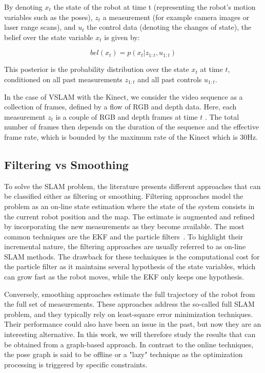 By denoting $x_t$ the state of the robot at time t (representing the robot's motion variables such as the poses), $z_t$ a measurement (for example camera images or laser range scans), and $u_t$ the control data (denoting the changes of state), the belief over the state variable $x_t$ is given by:

\[bel(x_t) = p(x_t | z_{1:t}, u_{1:t})\]

This posterior is the probability distribution over the state $x_t$ at time $t$, conditioned on all past measurements $z_{1:t}$ and all past controls $u_{1:t}$.

In the case of \gls{VSLAM} with the Kinect, we consider the video sequence as a collection of frames, defined by a flow of RGB and depth data. Here, each measurement $z_t$ is a couple of RGB and depth frames at time $t$ . The total number of frames then depends on the duration of the sequence and the effective frame rate, which is bounded by the maximum rate of the Kinect which is 30Hz.


\subsection{Filtering vs Smoothing}

To solve the \gls{SLAM} problem, the literature presents different approaches that can be classified either as filtering or smoothing. Filtering approaches model the problem as an on-line state estimation where the state of the system consists in the current robot position and the map. The estimate is augmented and refined by incorporating the new measurements as they become available.
The most common techniques are the \gls{EKF} and the particle filters~\cite{Thrun_2005}. To highlight their incremental nature, the filtering approaches are usually referred to as on-line \gls{SLAM} methods. The drawback for these techniques is the computational cost for the particle filter as it maintains several hypothesis of the state variables, which can grow fast as the robot moves, while the \gls{EKF} only keeps one hypothesis.

Conversely, smoothing approaches estimate the full trajectory of the robot from the full set of measurements. These approaches address the so-called full \gls{SLAM} problem, and they typically rely on least-square error minimization techniques. Their performance could also have been an issue in the past, but now they are an interesting alternative. In this work, we will therefore study the results that can be obtained from a graph-based approach. In contrast to the online techniques, the pose graph is said to be offline or a "lazy" technique as the optimization processing is triggered by specific constraints.

